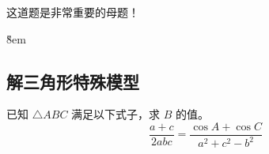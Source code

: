 \begin{warning}
    这道题是非常重要的母题！
\end{warning}

\v{8em}

\subsection{解三角形特殊模型}

\begin{example}
    已知 $\triangle A B C$ 满足以下式子，求 $B$ 的值。
    $$
        \frac{a+c}{2 a b c}=\frac{\cos A+\cos C}{a^2+c^2-b^2}
    $$
\end{example}
